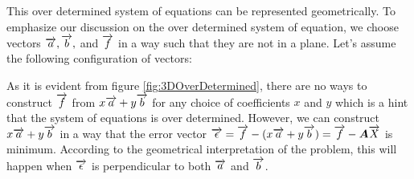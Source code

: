 This over determined system of equations can be represented geometrically. To emphasize our discussion on the over determined system of equation, we choose vectors $\overrightarrow{a}, \overrightarrow{b},$ and $\overrightarrow{f}$ in a way such that they are not in a plane. Let's assume the following configuration of vectors:



As it is evident from figure \ref{fig:3DOverDetermined}, there are no ways to construct $\overrightarrow{f}$ from $x\overrightarrow{a} + y\overrightarrow{b}$ for any choice of coefficients $x$ and $y$ which is a hint that the system of equations is over determined. However, we can construct $x\overrightarrow{a} + y\overrightarrow{b}$ in a way that the error vector $\overrightarrow{\epsilon} = \overrightarrow{f} - (x\overrightarrow{a} + y\overrightarrow{b}) = \overrightarrow{f} - \boldsymbol{A}\overrightarrow{X}$ is minimum. According to the geometrical interpretation of the problem, this will happen when $\overrightarrow{\epsilon}$ is perpendicular to both $\overrightarrow{a}$ and $\overrightarrow{b}$. 



